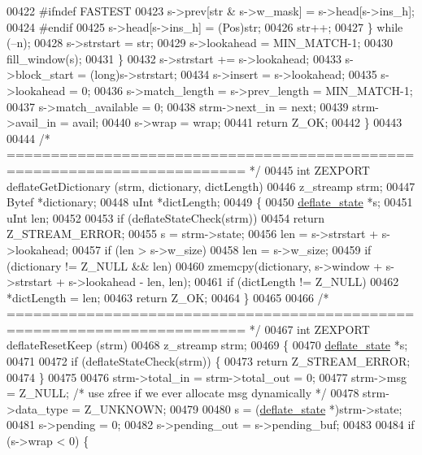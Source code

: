 \begin{DoxyCode}
00422 \textcolor{preprocessor}{#ifndef FASTEST}
00423             s->prev[str & s->w\_mask] = s->head[s->ins\_h];
00424 \textcolor{preprocessor}{#endif}
00425             s->head[s->ins\_h] = (Pos)str;
00426             str++;
00427         \} \textcolor{keywordflow}{while} (--n);
00428         s->strstart = str;
00429         s->lookahead = MIN\_MATCH-1;
00430         fill\_window(s);
00431     \}
00432     s->strstart += s->lookahead;
00433     s->block\_start = (long)s->strstart;
00434     s->insert = s->lookahead;
00435     s->lookahead = 0;
00436     s->match\_length = s->prev\_length = MIN\_MATCH-1;
00437     s->match\_available = 0;
00438     strm->next\_in = next;
00439     strm->avail\_in = avail;
00440     s->wrap = wrap;
00441     \textcolor{keywordflow}{return} Z\_OK;
00442 \}
00443 
00444 \textcolor{comment}{/* ========================================================================= */}
00445 \textcolor{keywordtype}{int} ZEXPORT deflateGetDictionary (strm, dictionary, dictLength)
00446     z\_streamp strm;
00447     Bytef *dictionary;
00448     uInt  *dictLength;
00449 \{
00450     \hyperlink{structinternal__state}{deflate\_state} *s;
00451     uInt len;
00452 
00453     \textcolor{keywordflow}{if} (deflateStateCheck(strm))
00454         \textcolor{keywordflow}{return} Z\_STREAM\_ERROR;
00455     s = strm->state;
00456     len = s->strstart + s->lookahead;
00457     \textcolor{keywordflow}{if} (len > s->w\_size)
00458         len = s->w\_size;
00459     \textcolor{keywordflow}{if} (dictionary != Z\_NULL && len)
00460         zmemcpy(dictionary, s->window + s->strstart + s->lookahead - len, len);
00461     \textcolor{keywordflow}{if} (dictLength != Z\_NULL)
00462         *dictLength = len;
00463     \textcolor{keywordflow}{return} Z\_OK;
00464 \}
00465 
00466 \textcolor{comment}{/* ========================================================================= */}
00467 \textcolor{keywordtype}{int} ZEXPORT deflateResetKeep (strm)
00468     z\_streamp strm;
00469 \{
00470     \hyperlink{structinternal__state}{deflate\_state} *s;
00471 
00472     \textcolor{keywordflow}{if} (deflateStateCheck(strm)) \{
00473         \textcolor{keywordflow}{return} Z\_STREAM\_ERROR;
00474     \}
00475 
00476     strm->total\_in = strm->total\_out = 0;
00477     strm->msg = Z\_NULL; \textcolor{comment}{/* use zfree if we ever allocate msg dynamically */}
00478     strm->data\_type = Z\_UNKNOWN;
00479 
00480     s = (\hyperlink{structinternal__state}{deflate\_state} *)strm->state;
00481     s->pending = 0;
00482     s->pending\_out = s->pending\_buf;
00483 
00484     if (s->wrap < 0) \{

\end{DoxyCode}
